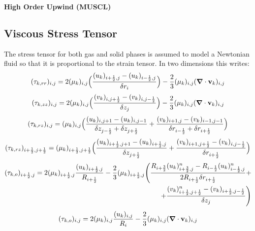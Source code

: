 {\bf High Order Upwind (MUSCL)}
%
\subsection{Viscous Stress Tensor}

The stress tensor for both gas and solid phases is assumed to model a Newtonian fluid
so that it is proportional to the strain tensor. In two dimensions this writes:\\

\begin{eqnarray}
\htmlimage{}
(\tau_{k,rr})_{i,j} = 2 (\mu_k)_{i,j} 
\Big( \frac{(u_k)_{i+\frac{1}{2},j} - (u_k)_{i-\frac{1}{2},j}}
{\delta r_{i}} \Big ) - \frac{2}{3} (\mu_k)_{i,j} 
(\mbox{\boldmath $\nabla$} \cdot {\bf v}_k)_{i,j}
\nonumber
\end{eqnarray}
%
\begin{eqnarray}
\htmlimage{}
(\tau_{k,zz})_{i,j} = 2 (\mu_k)_{i,j} 
\Big( \frac{(v_k)_{i,j+\frac{1}{2}} -(v_k)_{i,j-\frac{1}{2}}}
{\delta z_{j}} \Big ) - \frac{2}{3} (\mu_k)_{i,j} 
(\mbox{\boldmath $\nabla$} \cdot {\bf v}_k)_{i,j}
\nonumber
\end{eqnarray}
%
\begin{eqnarray}
\htmlimage{}
(\tau_{k,rz})_{i,j} = (\mu_k)_{i,j} \Big( \frac{(u_k)_{i,j+1} -(u_k)_{i,j-1}}
{\delta z_{j-\frac{1}{2}}+\delta z_{j+\frac{1}{2}}} +
\frac{(v_k)_{i+1,j} -(v_k)_{i-1,j-1}}
{\delta r_{i-\frac{1}{2}}+\delta r_{i+\frac{1}{2}}} \Big)
\nonumber
\end{eqnarray}
%
\begin{eqnarray}
\htmlimage{}
(\tau_{k,rz})_{i+\frac{1}{2},j+\frac{1}{2}} = (\mu_k)_{i+\frac{1}{2},j+\frac{1}{2}} 
\Big( \frac{(u_k)_{i+\frac{1}{2},j+1} -(u_k)_{i+\frac{1}{2},j}}
{\delta z_{j+\frac{1}{2}}} +
\frac{(v_k)_{i+1,j+\frac{1}{2}} -(v_k)_{i,j-\frac{1}{2}}}
{\delta r_{i+\frac{1}{2}}} \Big )
\nonumber
\end{eqnarray}
%
\begin{eqnarray}
\htmlimage{}
(\tau_{k,o})_{i+\frac{1}{2},j} = 2 (\mu_k)_{i+\frac{1}{2},j} 
\frac{(u_k)_{i+\frac{1}{2},j}}
{R_{i+\frac{1}{2}}} -
\frac{2}{3} (\mu_k)_{i+\frac{1}{2},j}
\Bigg( \frac{R_{i+\frac{3}{2}} (u_k)_{i+\frac{3}{2},j}^{n} - 
R_{i-\frac{1}{2}} (u_k)_{i-\frac{1}{2},j}^{n}}
{2 R_{i+\frac{1}{2}} \delta r_{i+\frac{1}{2}}} + \nonumber \\
+ \frac{(v_k)_{i+\frac{1}{2},j+\frac{1}{2}}^{n} - 
(v_k)_{i+\frac{1}{2},j-\frac{1}{2}}}
{\delta z_{j}} \Bigg)
\nonumber
\end{eqnarray}
%
\begin{eqnarray}
\htmlimage{}
(\tau_{k,o})_{i,j} = 2 (\mu_k)_{i,j} \frac{(u_k)_{i,j}}
{R_{i}} - \frac{2}{3} (\mu_k)_{i,j} (\mbox{\boldmath $\nabla$} 
\cdot {\bf v}_k)_{i,j}
\nonumber
\end{eqnarray}
